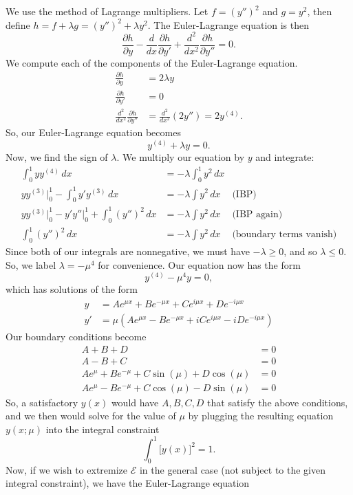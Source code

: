 \documentclass[10pt,letterpaper]{report}
\newcommand{\pp}[2]{\frac{\partial{#1}}{\partial{#2}}}
\begin{document}
\begin{enumerate}
We use the method of Lagrange multipliers. Let $f = (y'')^2$ and $g = y^2$, then define $h = f + \lambda g = (y'')^2 + \lambda y^2$. The Euler-Lagrange equation is then
\[
\pp{h}{y} - \frac{d}{dx}\pp{h}{y'} + \frac{d^2}{dx^2}\pp{h}{y''} = 0.
\]
We compute each of the components of the Euler-Lagrange equation.
\begin{align*}
    \pp{h}{y} &= 2\lambda y \\
    \pp{h}{y'} &= 0 \\
    \frac{d^2}{dx^2}\pp{h}{y''} &= \frac{d^2}{dx^2}(2y'') = 2y^{(4)}.
\end{align*}
So, our Euler-Lagrange equation becomes
\[
y^{(4)} + \lambda y = 0.
\]
Now, we find the sign of $\lambda$. We multiply our equation by $y$ and integrate:
\begin{align*}
    \int_0^1 yy^{(4)}\,dx &= - \lambda \int_0^1  y^2\,dx
    \\
    y y^{(3)} \big\vert_0^1 - \int_0^1y'y^{(3)}\,dx &= - \lambda \int  y^2\,dx 
    &\textrm{(IBP)}
    \\
    y y^{(3)} \big\vert_0^1 - y'y''\big\vert_0^1 + \int_0^1(y'')^2\,dx &= - \lambda \int  y^2\,dx 
    &\textrm{(IBP again)}
    \\
    \int_0^1(y'')^2\,dx &= - \lambda \int y^2\,dx 
    &\textrm{(boundary terms vanish)}
\end{align*}
Since both of our integrals are nonnegative, we must have $-\lambda \geq 0$, and so $\lambda \leq 0$. So, we label $\lambda = -\mu^4$ for convenience. Our equation now has the form
\[
y^{(4)} - \mu^4 y = 0,
\]
which has solutions of the form
\begin{align*}
y &= A e^{\mu x} + B e^{-\mu x} + Ce^{i\mu x} + D e^{-i\mu x} \\
y' &= \mu\left(A e^{\mu x} - B e^{-\mu x} + i C e^{i\mu x} -i D e^{-i\mu x}\right)
\end{align*}
Our boundary conditions become
\begin{align*}
    A + B + D &= 0 \\
    A - B + C &= 0 \\
    A e^{\mu} + Be^{-\mu} + C\sin(\mu) + D\cos(\mu) &= 0 \\
    Ae^\mu - Be^{-\mu} + C\cos(\mu) - D\sin(\mu) &= 0
\end{align*}
So, a satisfactory $y(x)$ would have $A, B, C, D$ that satisfy the above conditions, and we then would solve for the value of $\mu$ by plugging the resulting equation $y(x; \mu)$ into the integral constraint
\[
\int_0^1 \big[y(x)\big]^2 = 1.
\]
Now, if we wish to extremize $\mathcal{E}$ in the general case (not subject to the given integral constraint), we have the Euler-Lagrange equation 

\end{enumerate}
\end{document}

